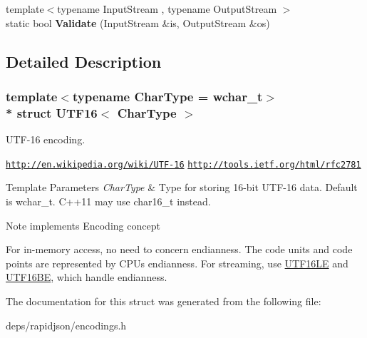 \begin{DoxyCompactItemize}
\item 
{\footnotesize template$<$typename Input\+Stream , typename Output\+Stream $>$ }\\static bool {\bfseries Validate} (Input\+Stream \&is, Output\+Stream \&os)\hypertarget{struct_u_t_f16_a7516184ed5dce10c0e7895bec124d97d}{}\label{struct_u_t_f16_a7516184ed5dce10c0e7895bec124d97d}

\end{DoxyCompactItemize}


\subsection{Detailed Description}
\subsubsection*{template$<$typename Char\+Type = wchar\+\_\+t$>$\\*
struct U\+T\+F16$<$ Char\+Type $>$}

U\+T\+F-\/16 encoding. 

\href{http://en.wikipedia.org/wiki/UTF-16}{\tt http\+://en.\+wikipedia.\+org/wiki/\+U\+T\+F-\/16} \href{http://tools.ietf.org/html/rfc2781}{\tt http\+://tools.\+ietf.\+org/html/rfc2781} 
\begin{DoxyTemplParams}{Template Parameters}
{\em Char\+Type} & Type for storing 16-\/bit U\+T\+F-\/16 data. Default is wchar\+\_\+t. C++11 may use char16\+\_\+t instead. \\
\hline
\end{DoxyTemplParams}
\begin{DoxyNote}{Note}
implements Encoding concept

For in-\/memory access, no need to concern endianness. The code units and code points are represented by C\+PU\textquotesingle{}s endianness. For streaming, use \hyperlink{struct_u_t_f16_l_e}{U\+T\+F16\+LE} and \hyperlink{struct_u_t_f16_b_e}{U\+T\+F16\+BE}, which handle endianness. 
\end{DoxyNote}


The documentation for this struct was generated from the following file\+:\begin{DoxyCompactItemize}
\item 
deps/rapidjson/encodings.\+h\end{DoxyCompactItemize}
